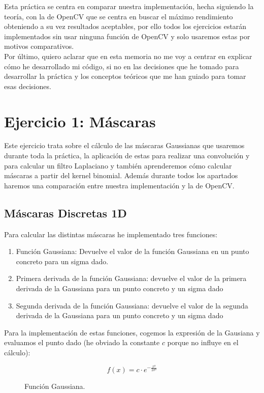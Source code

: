 \documentclass[12pt,spanish]{article}
\begin{document}
Esta práctica se centra en comparar nuestra implementación, hecha siguiendo la teoría, con la de OpenCV que se centra en buscar el máximo rendimiento obteniendo a su vez resultados aceptables, por ello todos los ejercicios estarán implementados sin usar ninguna función de OpenCV y solo usaremos estas por motivos comparativos.\\


Por último, quiero aclarar que en esta memoria no me voy a centrar en explicar cómo he desarrollado mi código, si no en las decisiones que he tomado para desarrollar la práctica y los conceptos teóricos que me han guiado para tomar esas decisiones.


\section{Ejercicio 1: Máscaras}
Este ejercicio trata sobre el cálculo de las máscaras Gaussianas que usaremos durante toda la práctica, la aplicación de estas para realizar una convolución y  para calcular un filtro Laplaciano y también aprenderemos cómo calcular máscaras a partir del kernel binomial. Además durante todos los apartados haremos una comparación entre nuestra implementación y la de OpenCV.

\subsection{Máscaras Discretas 1D}
Para calcular las distintas máscaras he implementado tres funciones:
\begin{enumerate}
	\item Función Gaussiana: Devuelve el valor de la función Gaussiana en un punto concreto para un sigma dado.
	\item Primera derivada de la función Gaussiana: devuelve el valor de la primera derivada de la Gaussiana para un punto concreto y un sigma dado
	\item Segunda derivada de la función Gaussiana: devuelve el valor de la segunda derivada de la Gaussiana para un punto concreto y un sigma dado
\end{enumerate}

Para la implementación de estas funciones, cogemos la expresión de la Gausiana y evaluamos el punto dado (he obviado la constante $c$ porque no influye en el cálculo):

\pagebreak

\begin{figure}
	\centering
	\[f(x) = c \cdot e^{-\frac{x²}{2\sigma²}} \]
	\caption{Función Gaussiana.}
	\label{f_gaussiana}
\end{figure}
\end{document}
